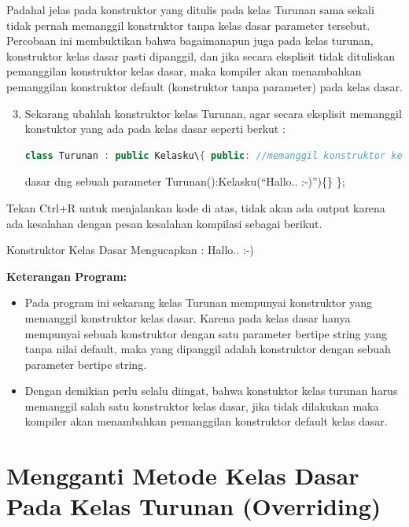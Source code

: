 Padahal jelas pada konstruktor yang ditulis pada kelas Turunan sama
sekali tidak pernah memanggil konstruktor tanpa kelas dasar parameter
tersebut. Percobaan ini membuktikan bahwa bagaimanapun juga pada kelas
turunan, konstruktor kelas dasar pasti dipanggil, dan jika secara
eksplisit tidak dituliskan pemanggilan konstruktor kelas dasar, maka
kompiler akan menambahkan pemanggilan konstruktor default (konstruktor
tanpa parameter) pada kelas dasar.

\begin{enumerate}

\setcounter{enumi}{2}
\item
  Sekarang ubahlah konstruktor kelas Turunan, agar secara eksplisit
  memanggil konstuktor yang ada pada kelas dasar seperti berkut :
\begin{lstlisting}[language=c++, numbers=none]
class Turunan : public Kelasku\{ public: //memanggil konstruktor kelas
\end{lstlisting}
  
  dasar dng sebuah parameter Turunan():Kelasku(``Hallo.. :-)'')\{\} \};
\end{enumerate}

Tekan Ctrl+R untuk menjalankan kode di atas, tidak akan ada output
karena ada kesalahan dengan pesan kesalahan kompilasi sebagai berikut.

\begin{lcverbatim}
Konstruktor Kelas Dasar 
Mengucapkan : Hallo.. :-)
\end{lcverbatim}
 

\textbf{Keterangan Program:}

\begin{itemize}

\item
  Pada program ini sekarang kelas Turunan mempunyai konstruktor yang
  memanggil konstruktor kelas dasar. Karena pada kelas dasar hanya
  mempunyai sebuah konstruktor dengan satu parameter bertipe string yang
  tanpa nilai default, maka yang dipanggil adalah konstruktor dengan
  sebuah parameter bertipe string.
\item
  Dengan demikian perlu selalu diingat, bahwa konstuktor kelas turunan
  harus memanggil salah satu konstruktor kelas dasar, jika tidak
  dilakukan maka kompiler akan menambahkan pemanggilan konstruktor
  default kelas dasar.
\end{itemize}

\section{Mengganti Metode Kelas Dasar Pada Kelas Turunan
(Overriding)}\label{mengganti-metode-kelas-dasar-pada-kelas-turunan-overriding}

